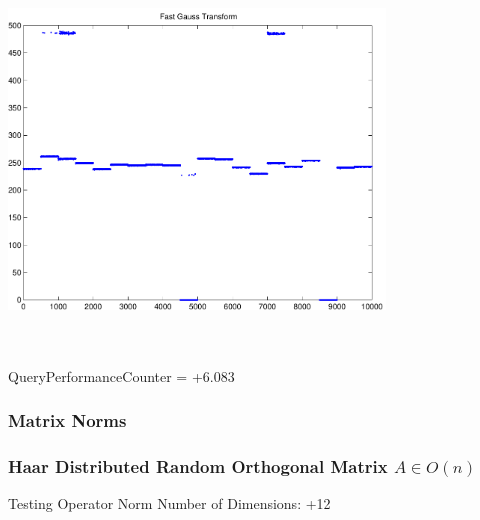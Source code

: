 \documentclass[9pt]{article}
\theoremstyle{plain}
\theoremstyle{definition}
\theoremstyle{remark}
\numberwithin{equation}{section}
\begin{document}
\includegraphics[width=10.0cm,height=10.0cm]{FGT20_Centers.pdf}

QueryPerformanceCounter  =  +6.083
\subsubsection{Matrix Norms}
\subsubsection{Haar Distributed Random Orthogonal Matrix $A \in O(n)$}
 Testing Operator Norm
Number of Dimensions: +12
\end{document}
